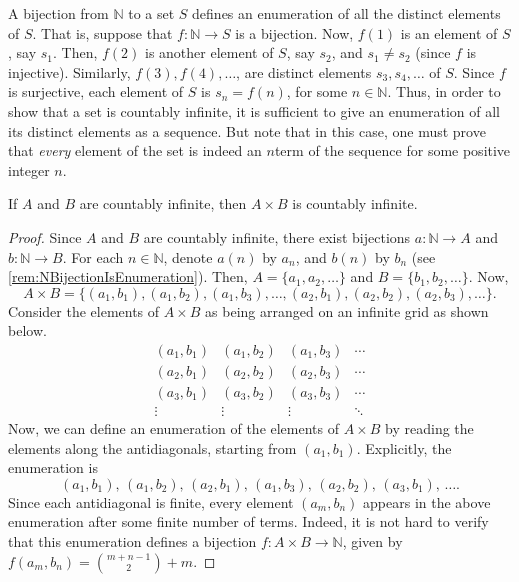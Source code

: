 \begin{Remark*}\label{rem:NBijectionIsEnumeration}
A bijection from $\mathbb N$ to a set $S$ defines an enumeration of all the distinct elements of $S$. That is, suppose that $f \colon \mathbb N \to S$ is a bijection. Now, $f(1)$ is an element of $S$, say $s_1$. Then, $f(2)$ is another element of $S$, say $s_2$, and $s_1 \ne s_2$ (since $f$ is injective). Similarly, $f(3), f(4), \ldots$, are distinct elements $s_3, s_4, \ldots$ of $S$. Since $f$ is surjective, each element of $S$ is $s_n = f(n)$, for some $n \in \mathbb N$. Thus, in order to show that a set is countably infinite, it is sufficient to give an enumeration of all its distinct elements as a sequence. But note that in this case, one must prove that \emph{every} element of the set is indeed an $n$\nth term of the sequence for some positive integer $n$.
\end{Remark*}

\begin{Lemma}\label{lem:CIxCI=CI}
If $A$ and $B$ are countably infinite, then $A \times B$ is countably infinite.
\end{Lemma}

\begin{proof}
Since $A$ and $B$ are countably infinite, there exist bijections $a \colon \mathbb N \to A$ and $b \colon \mathbb N \to B$. For each $n \in \mathbb N$, denote $a(n)$ by $a_n$, and $b(n)$ by $b_n$ (see \cref{rem:NBijectionIsEnumeration}). Then, $A = \{a_1, a_2, \ldots\}$ and $B = \{b_1, b_2, \ldots\}$. Now,
\begin{equation*}
A \times B = \{(a_1, b_1), (a_1, b_2), (a_1, b_3), \ldots, (a_2, b_1), (a_2, b_2), (a_2, b_3), \ldots\}.
\end{equation*}
Consider the elements of $A \times B$ as being arranged on an infinite grid as shown below.
\begin{equation*}
\begin{matrix}
(a_1, b_1) & (a_1, b_2) & (a_1, b_3) & \cdots \\
(a_2, b_1) & (a_2, b_2) & (a_2, b_3) & \cdots \\
(a_3, b_1) & (a_3, b_2) & (a_3, b_3) & \cdots \\
\vdots & \vdots & \vdots & \ddots
\end{matrix}
\end{equation*}
Now, we can define an enumeration of the elements of $A \times B$ by reading the elements along the antidiagonals, starting from $(a_1, b_1)$. Explicitly, the enumeration is
\begin{equation*}
(a_1, b_1),\, (a_1, b_2),\, (a_2, b_1),\, (a_1, b_3),\, (a_2, b_2),\, (a_3, b_1),\, \ldots.
\end{equation*}
Since each antidiagonal is finite, every element $(a_m, b_n)$ appears in the above enumeration after some finite number of terms. Indeed, it is not hard to verify that this enumeration defines a bijection $f \colon A \times B \to \mathbb N$, given by $f(a_m, b_n) = \binom {m + n - 1} 2 + m$.
\end{proof}

